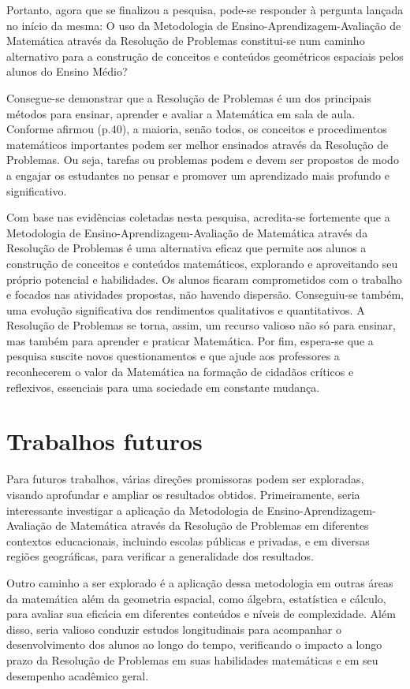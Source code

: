 Portanto, agora que se finalizou a pesquisa, pode-se responder à pergunta lançada no início da mesma: O uso da Metodologia de Ensino-Aprendizagem-Avaliação de Matemática através da Resolução de Problemas constitui-se num caminho alternativo para a construção de conceitos e conteúdos geométricos espaciais pelos alunos do Ensino Médio?

Consegue-se demonstrar que a Resolução de Problemas é um dos principais métodos para ensinar, aprender e avaliar a Matemática em sala de aula. Conforme afirmou  (p.40), a maioria, senão todos, os conceitos e procedimentos matemáticos importantes podem ser melhor ensinados através da Resolução de Problemas. Ou seja, tarefas ou problemas podem e devem ser propostos de modo a engajar os estudantes no pensar e promover um aprendizado mais profundo e significativo.

Com base nas evidências coletadas nesta pesquisa, acredita-se fortemente que a Metodologia de Ensino-Aprendizagem-Avaliação de Matemática através da Resolução de Problemas é uma alternativa eficaz que permite aos alunos a construção de conceitos e conteúdos matemáticos, explorando e aproveitando seu próprio potencial e habilidades. Os alunos ficaram comprometidos com o trabalho e focados nas atividades propostas, não havendo dispersão. Conseguiu-se também, uma evolução significativa dos rendimentos qualitativos e quantitativos. A Resolução de Problemas se torna, assim, um recurso valioso não só para ensinar, mas também para aprender e praticar Matemática. Por fim, espera-se que a pesquisa suscite novos questionamentos e que ajude aos professores a reconhecerem o valor da Matemática na formação de cidadãos críticos e reflexivos, essenciais para uma sociedade em constante mudança.

\section{Trabalhos futuros}

Para futuros trabalhos, várias direções promissoras podem ser exploradas, visando aprofundar e ampliar os resultados obtidos. Primeiramente, seria interessante investigar a aplicação da Metodologia de Ensino-Aprendizagem-Avaliação de Matemática através da Resolução de Problemas em diferentes contextos educacionais, incluindo escolas públicas e privadas, e em diversas regiões geográficas, para verificar a generalidade dos resultados.

Outro caminho a ser explorado é a aplicação dessa metodologia em outras áreas da matemática além da geometria espacial, como álgebra, estatística e cálculo, para avaliar sua eficácia em diferentes conteúdos e níveis de complexidade. Além disso, seria valioso conduzir estudos longitudinais para acompanhar o desenvolvimento dos alunos ao longo do tempo, verificando o impacto a longo prazo da Resolução de Problemas em suas habilidades matemáticas e em seu desempenho acadêmico geral.

